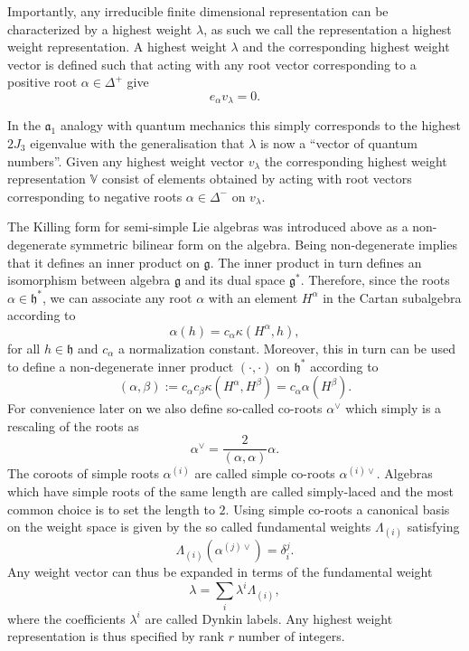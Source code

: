 Importantly, any irreducible finite dimensional representation can be characterized by a highest weight $\lambda$, as such we call the representation a highest weight representation. A highest weight $\lambda$ and the corresponding highest weight vector is defined such that acting with any root vector corresponding to a positive root $\alpha\in\Delta^+$ give
\begin{equation}
    e_\alpha v_\lambda = 0.
\end{equation}

In the $\mathfrak{a}_1$ analogy with quantum mechanics this simply corresponds to the highest $2J_3$ eigenvalue with the generalisation that $\lambda$ is now a ``vector of quantum numbers''. Given any highest weight vector $v_\lambda$ the corresponding highest weight representation $\mathbb{V}$ consist of elements obtained by acting with root vectors corresponding to negative roots $\alpha\in\Delta^-$ on $v_\lambda$.

The Killing form for semi-simple Lie algebras was introduced above as a non-degenerate symmetric bilinear form on the algebra. Being non-degenerate implies that it defines an inner product on $\mathfrak{g}$. The inner product in turn defines an isomorphism between algebra $\mathfrak{g}$ and its dual space $\mathfrak{g}^*$. Therefore, since the roots $\alpha\in\mathfrak{h}^*$, we can associate any root $\alpha$ with an element $H^\alpha$ in the Cartan subalgebra according to 
\begin{equation}
    \alpha(h) = c_\alpha \kappa(H^\alpha,h),
\end{equation}
for all $h\in\mathfrak{h}$ and $c_\alpha$ a normalization constant. Moreover, this in turn can be used to define a non-degenerate inner product $(\cdot,\cdot)$ on $\mathfrak{h}^*$ according to
\begin{equation}
    (\alpha,\beta):= c_\alpha c_\beta \kappa(H^\alpha,H^\beta) = c_\alpha \alpha(H^\beta).
\end{equation}
For convenience later on we also define so-called co-roots $\alpha^\vee$ which simply is a rescaling of the roots as 
\begin{equation}
    \alpha^\vee = \frac{2}{(\alpha,\alpha)}\alpha.
\end{equation}
The coroots of simple roots $\alpha^{(i)}$ are called simple co-roots $\alpha^{(i)\vee}$. Algebras which have simple roots of the same length are called simply-laced and the most common choice is to set the length to $2$. Using simple co-roots a canonical basis on the weight space is given by the so called fundamental weights $\Lambda_{(i)}$ satisfying 
\begin{equation}
    \Lambda_{(i)}(\alpha^{(j)\vee}) = \delta^j_i.
\end{equation}
Any weight vector can thus be expanded in terms of the fundamental weight 
\begin{equation}
    \lambda = \sum_i \lambda^i\Lambda_{(i)},
\end{equation}
where the coefficients $\lambda^i$ are called Dynkin labels. Any highest weight representation is thus specified by rank $r$ number of integers. 


